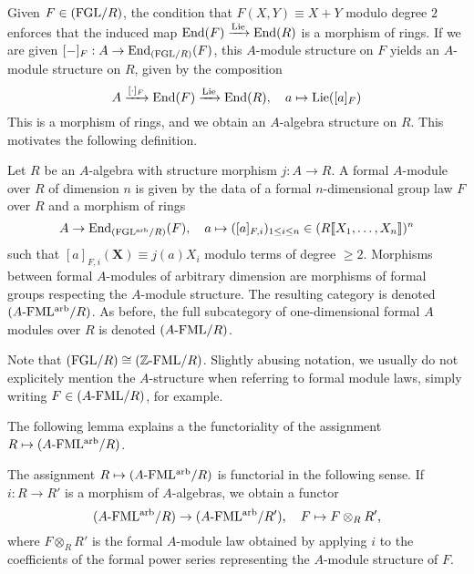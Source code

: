 Given $F \in {(\mathrm{FGL}/{R})}$, the condition that 
$F(X,Y) \equiv X+Y$ modulo degree $2$ enforces that the induced map
$\operatorname{End}(F) \xrightarrow{\operatorname{Lie}} \operatorname{End}(R)$ is a morphism of rings. 
If we are given $[-]_F: A \to \operatorname{End}_{{(\mathrm{FGL}/{R})}}(F)$, this $A$-module structure on $F$ 
yields an $A$-module structure on $R$, given by the composition
\begin{equation*}
  A \xrightarrow{[\cdot]_F} \operatorname{End}(F) \xrightarrow{\operatorname{Lie}} \operatorname{End}(R), \quad a \mapsto \operatorname{Lie}([a]_F)
\end{equation*}
This is a morphism of rings, and we obtain an $A$-algebra structure on $R$. 
This motivates the following definition.
\begin{defi}\label{def:formalmodulelaw}
  Let $R$ be an $A$-algebra with structure morphism $j: A \to R$. A formal
  $A$-module over $R$ of dimension $n$ is
  given by the data of 
  a formal $n$-dimensional group law $F$ over $R$ and a morphism of rings
  \begin{equation*}
    A \to \operatorname{End}_{{(\mathrm{FGL^{arb}}/{R})}} (F), \quad a \mapsto ([a]_{F,i}
    )_{1 \leq i \leq n} \in (R \llbracket X_1, \dots, X_n \rrbracket )^n
  \end{equation*}
  such that $[a]_{F,i}(\mathbf X) \equiv j(a) X_i$ modulo terms of degree 
  $\geq 2$. Morphisms between formal $A$-modules of arbitrary dimension are 
  morphisms of formal groups respecting the $A$-module structure. 
  The resulting category is denoted ${({A}\text-\mathrm{FML^{arb}}/{R})}$. As before, the full
  subcategory of one-dimensional formal $A$ modules over $R$ is denoted 
  ${({A}\text-\mathrm{FML}/{R})}$.
\end{defi}

Note that ${(\mathrm{FGL}/{R})} \cong {({\mathbb{Z}}\text-\mathrm{FML}/{R})}$.
Slightly abusing notation, we usually do not explicitely mention the $A$-structure
when referring to formal module laws, simply writing $F \in {({A}\text-\mathrm{FML}/{R})}$, for
example. 

The following lemma explains a the functoriality of the assignment
$R \mapsto {({A}\text-\mathrm{FML^{arb}}/{R})}$.

\begin{lem}\label{lem:FMLFunc}
  The assignment $R \mapsto {({A}\text-\mathrm{FML^{arb}}/{R})}$ is functorial in the following sense.
  If $i: R \to R'$ is a morphism of $A$-algebras, we obtain a functor
  \begin{equation*}
    {({A}\text-\mathrm{FML^{arb}}/{R})} \to {({A}\text-\mathrm{FML^{arb}}/{R'})}, \quad F \mapsto F \otimes_R R',
  \end{equation*}
  where $F \otimes_R R'$ is the formal $A$-module law obtained by applying $i$
  to the coefficients of the formal power series representing the $A$-module
  structure of $F$. 
\end{lem}


